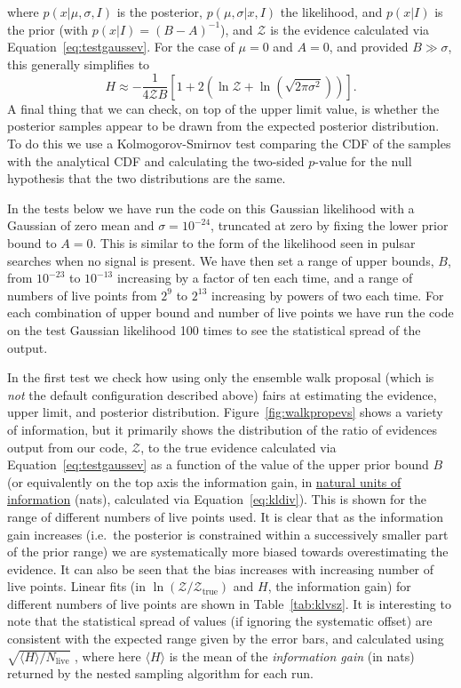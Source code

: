 where $p(x|\mu,\sigma,I)$ is the posterior, $p(\mu,\sigma|x,I)$ the likelihood, and $p(x|I)$ is the prior (with $p(x|I) = (B-A)^{-1}$), and $\mathcal{Z}$ is the
evidence calculated via Equation~\ref{eq:testgaussev}. For the case of $\mu=0$ and $A=0$, and provided $B \gg \sigma$, this generally simplifies
to
\begin{equation}
H \approx -\frac{1}{4\mathcal{Z}B}\left[1+2\left(\ln{\mathcal{Z}} +\ln{\left(\sqrt{2\pi\sigma^2}\right)}\right)\right].
\end{equation}
A final thing that we can check, on top of the upper limit value, is whether the posterior samples appear to be drawn from the expected
posterior distribution. To do this we use a Kolmogorov-Smirnov test comparing the CDF of the samples with the analytical CDF and calculating the
two-sided $p$-value for the null hypothesis that the two distributions are the same.

In the tests below we have run the code on this Gaussian likelihood with a Gaussian of zero mean and $\sigma = 10^{-24}$, truncated at zero
by fixing the lower prior bound to $A=0$. This is similar to the form of the likelihood seen in pulsar searches when no signal is present.
We have then set a range of upper bounds, $B$, from $10^{-23}$ to $10^{-13}$ increasing by a factor of ten each time, and a range of numbers of
live points from $2^9$ to $2^{13}$ increasing by powers of two each time. For each combination of upper bound and number of live points we have
run the code on the test Gaussian likelihood 100 times to see the statistical spread of the output.

In the first test we check how using only the ensemble walk proposal (which is {\it not} the default configuration described above) fairs at
estimating the evidence, upper limit, and posterior distribution. Figure~\ref{fig:walkpropevs} shows a variety of information, but it
primarily shows the distribution of the ratio of evidences output from our code, $\mathcal{Z}$, to the true evidence calculated via
Equation~\ref{eq:testgaussev} as a function of the value of the upper prior bound $B$ (or equivalently on the top axis the
information gain, in \href{https://en.wikipedia.org/wiki/Nat_(unit)}{natural units of information} (nats), calculated via Equation~\ref{eq:kldiv}).
This is shown for the range of different numbers of live points used.
It is clear that as the information gain increases (i.e.\ the posterior is constrained within a successively smaller part of the
prior range) we are systematically more biased towards overestimating the evidence. It can also be seen that the bias increases with
increasing number of live points. Linear fits (in $\ln{(\mathcal{Z}/\mathcal{Z}_{\text{true}})}$ and $H$, the information gain) for different numbers
of live points are shown in Table~\ref{tab:klvsz}. It is interesting to note that the statistical spread of values (if ignoring the
systematic offset) are consistent with the expected range given by the error bars, and calculated using $\sqrt{\langle H \rangle/N_{\text{live}}}$ \citep{Skilling:2006}, where here
$\langle H \rangle$ is the mean of the {\it information gain} (in nats) returned by the nested sampling algorithm for each run.

